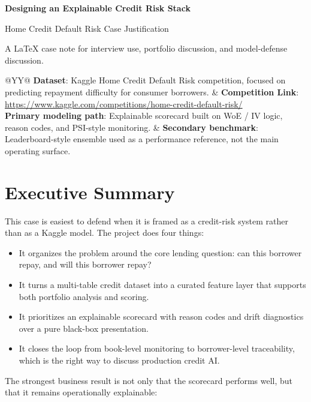 \documentclass[11pt]{article}
\newcommand{\metric}[2]{\textbf{#1}: #2}
\begin{document}
{\Huge\bfseries Designing an Explainable Credit Risk Stack\par}
{\Large Home Credit Default Risk Case Justification\par}
\vspace{0.5em}
{\large A LaTeX case note for interview use, portfolio discussion, and model-defense discussion.\par}
\vspace{0.75em}

\begin{tabularx}{\textwidth}{@{}YY@{}}
\metric{Dataset}{Kaggle Home Credit Default Risk competition, focused on predicting repayment difficulty for consumer borrowers.} &
\metric{Competition Link}{\url{https://www.kaggle.com/competitions/home-credit-default-risk/}} \\
\metric{Primary modeling path}{Explainable scorecard built on WoE / IV logic, reason codes, and PSI-style monitoring.} &
\metric{Secondary benchmark}{Leaderboard-style ensemble used as a performance reference, not the main operating surface.}
\end{tabularx}

\vspace{1em}

\section{Executive Summary}

This case is easiest to defend when it is framed as a credit-risk system rather than as a Kaggle model. The project does four things:

\begin{itemize}
  \item It organizes the problem around the core lending question: can this borrower repay, and will this borrower repay?
  \item It turns a multi-table credit dataset into a curated feature layer that supports both portfolio analysis and scoring.
  \item It prioritizes an explainable scorecard with reason codes and drift diagnostics over a pure black-box presentation.
  \item It closes the loop from book-level monitoring to borrower-level traceability, which is the right way to discuss production credit AI.
\end{itemize}

The strongest business result is not only that the scorecard performs well, but that it remains operationally explainable:
\end{document}
